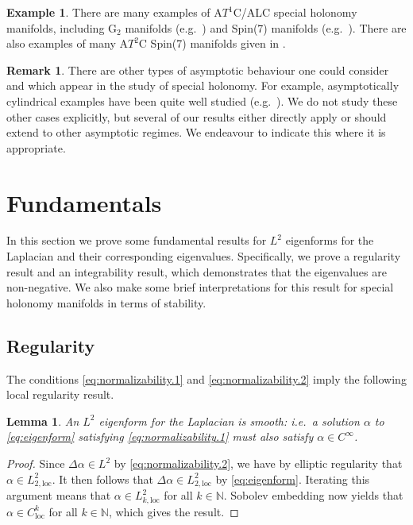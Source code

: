 \documentclass{article}
\newtheorem{lem}[thm]{Lemma}
\theoremstyle{definition}
\newtheorem{rmk}[thm]{Remark}
\newtheorem{eg}[thm]{Example}
\numberwithin{thm}{section}
\numberwithin{equation}{section}
\begin{document}
\begin{eg}
There are many examples of A$T^1$C/ALC special holonomy manifolds, including $\mathrm{G}_2$ manifolds (e.g.~\cite{FHN1,FHN2}) and Spin(7) manifolds (e.g.~\cite{FoscoloSpin,Lehmann}).  There are also examples of many A$T^2$C Spin(7) manifolds given in \cite{Cavalleri}.
\end{eg}

\begin{rmk}
    There are other types of asymptotic behaviour one could consider and which appear in the study of special holonomy.  For example,  asymptotically cylindrical examples have been quite well studied (e.g.~\cite{HHN,Kovalev,KovNor}).  We do not study these other cases explicitly, but several of our results either directly apply or should extend to other asymptotic regimes.  We endeavour to indicate this where it is appropriate.
\end{rmk}

\section{Fundamentals}\label{sec:fundamental}

In this section we prove some fundamental results for $L^2$ eigenforms for the Laplacian and their corresponding eigenvalues.  Specifically, we prove a regularity result and an integrability result, which demonstrates that the eigenvalues are non-negative.  We also make some brief interpretations for this result for special holonomy manifolds in terms of stability.

\subsection{Regularity}
The conditions \eqref{eq:normalizability.1} and \eqref{eq:normalizability.2}  imply the following local regularity result.

\begin{lem}\label{lem:smooth}
    An $L^2$ eigenform for the Laplacian is smooth: i.e.~a solution $\alpha$ to \eqref{eq:eigenform} satisfying \eqref{eq:normalizability.1} must also satisfy $\alpha\in C^{\infty}$. 
\end{lem}

\begin{proof}
    Since $\Delta\alpha\in L^2$ by \eqref{eq:normalizability.2}, we have by elliptic regularity that $\alpha\in L^2_{2,\text{loc}}$. It then follows that $\Delta\alpha\in L^2_{2,\text{loc}}$ by \eqref{eq:eigenform}.  Iterating this argument means that $\alpha\in L^2_{k,\text{loc}}$ for all $k\in\mathbb{N}$.  Sobolev embedding now yields that $\alpha\in C^k_{\text{loc}}$ for all $k\in\mathbb{N}$, which gives the result.
\end{proof}
\end{document}
